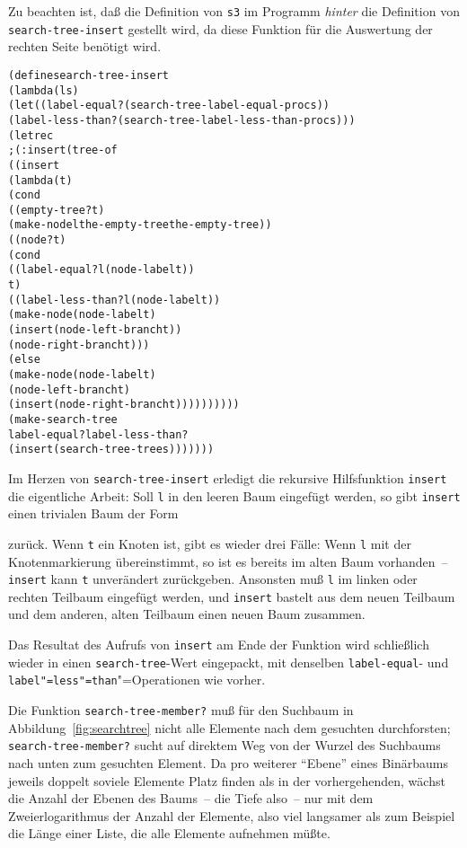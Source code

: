 %
Zu beachten ist, daß die Definition von \texttt{s3} im Programm
\emph{hinter} die Definition von \texttt{search-tree-insert} gestellt
wird, da diese Funktion für die Auswertung der rechten Seite benötigt wird.
%
\begin{alltt}
(define search-tree-insert
  (lambda (l s)
    (let ((label-equal? (search-tree-label-equal-proc s))
          (label-less-than? (search-tree-label-less-than-proc s)))
      (letrec
          ; (: insert (tree-of %a) -> (tree-of %a))
          ((insert
            (lambda (t)
              (cond
               ((empty-tree? t)
                (make-node l the-empty-tree the-empty-tree))
               ((node? t)
                (cond
                  ((label-equal? l (node-label t))
                   t)
                  ((label-less-than? l (node-label t))
                   (make-node (node-label t)
                              (insert (node-left-branch t))
                              (node-right-branch t)))
                  (else
                   (make-node (node-label t)
                              (node-left-branch t)
                              (insert (node-right-branch t))))))))))
        (make-search-tree
         label-equal? label-less-than?
         (insert (search-tree-tree s)))))))
\end{alltt}
%
Im Herzen von \texttt{search-tree-insert} erledigt die rekursive
Hilfsfunktion \texttt{insert} die eigentliche Arbeit: Soll
\texttt{l} in den leeren Baum eingefügt werden, so gibt
\texttt{insert} einen trivialen Baum der Form
%
\begin{pspdf}
\begin{center}
    {\Tdot\Tdot}
\end{center}
\end{pspdf}
% 
zurück.  Wenn \texttt{t} ein Knoten ist, gibt es wieder drei Fälle:
Wenn \texttt{l} mit der
Knotenmarkierung übereinstimmt, so ist es bereits im alten Baum
vorhanden~-- \texttt{insert} kann \texttt{t} unverändert
zurückgeben.  Ansonsten muß
\texttt{l} im linken oder rechten Teilbaum eingefügt werden,
und \texttt{insert} bastelt aus dem neuen Teilbaum und dem anderen, alten Teilbaum
einen neuen Baum zusammen.

Das Resultat des Aufrufs von \texttt{insert} am Ende der Funktion wird
schließlich wieder in einen \texttt{search-tree}-Wert eingepackt,
mit denselben \texttt{label-equal}- und \texttt{label"=less"=than}"=Operationen wie vorher.

Die Funktion \texttt{search-tree-member?} muß für den Suchbaum in
Abbildung~\ref{fig:searchtree} nicht alle Elemente nach dem gesuchten
durchforsten; \texttt{search-tree-member?} sucht auf direktem Weg
von der Wurzel des Suchbaums nach unten zum gesuchten Element.  Da pro
weiterer "`Ebene"' eines Binärbaums jeweils doppelt soviele Elemente
Platz finden als in der vorhergehenden, wächst die Anzahl der Ebenen
des Baums~-- die Tiefe also~-- nur mit dem Zweierlogarithmus der
Anzahl der Elemente, also viel langsamer als zum Beispiel die Länge
einer Liste, die alle Elemente aufnehmen müßte.

